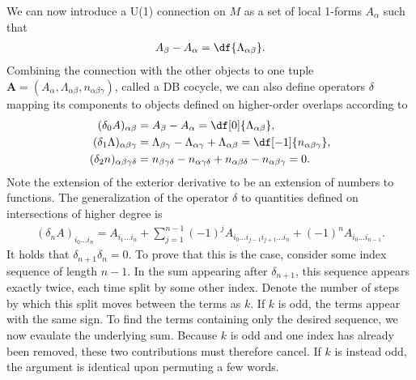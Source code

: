 We can now introduce a U(1) connection on $M$ as a set of local 1-forms $A_{\alpha}$ such that
\begin{align*}
	A_{\beta} - A_{\alpha} = \df{\Lambda_{\alpha\beta}}.
\end{align*}
Combining the connection with the other objects to one tuple $\mathbf{A} = (A_{\alpha}, \Lambda_{\alpha\beta}, n_{\alpha\beta\gamma})$, called a DB cocycle, we can also define operators $\delta$ mapping its components to objects defined on higher-order overlaps according to
\begin{align*}
	(\delta_{0}A)_{\alpha\beta}             &= A_{\beta} - A_{\alpha} = \df[0]{\Lambda_{\alpha\beta}}, \\
	(\delta_{1}\Lambda)_{\alpha\beta\gamma} &= \Lambda_{\beta\gamma} - \Lambda_{\alpha\gamma} + \Lambda_{\alpha\beta} = \df[-1]{n_{\alpha\beta\gamma}}, \\
	(\delta_{2}n)_{\alpha\beta\gamma\delta}  &= n_{\beta\gamma\delta} - n_{\alpha\gamma\delta} + n_{\alpha\beta\delta} - n_{\alpha\beta\gamma} = 0.
\end{align*}
Note the extension of the exterior derivative to be an extension of numbers to functions. The generalization of the operator $\delta$ to quantities defined on intersections of higher degree is
\begin{align*}
	(\delta_{n}A)_{i_{0}\dots i_{n}} = A_{i_{1}\dots i_{n}} + \sum\limits_{j = 1}^{n - 1}(-1)^{j}A_{i_{0}\dots i_{j - 1}i_{j + 1}\dots i_{n}} + (-1)^{n}A_{i_{0}\dots i_{n - 1}}.
\end{align*}
It holds that $\delta_{n + 1}\delta_{n} = 0$. To prove that this is the case, consider some index sequence of length $n - 1$. In the sum appearing after $\delta_{n + 1}$, this sequence appears exactly twice, each time split by some other index. Denote the number of steps by which this split moves between the terms as $k$. If $k$ is odd, the terms appear with the same sign. To find the terms containing only the desired sequence, we now evaulate the underlying sum. Because $k$ is odd and one index has already been removed, these two contributions must therefore cancel. If $k$ is instead odd, the argument is identical upon permuting a few words.

